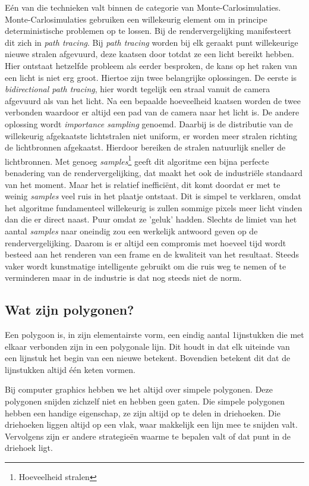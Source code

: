 \documentclass[12pt, a4paper]{article}
\begin{document}
Eén van die technieken valt binnen de categorie van Monte-Carlosimulaties. Monte-Carlosimulaties gebruiken een willekeurig element  om in principe deterministische problemen op te lossen. Bij de rendervergelijking manifesteert dit zich in \emph{path tracing}. Bij \emph{path tracing} worden bij elk geraakt punt willekeurige nieuwe stralen afgevuurd, deze kaatsen door totdat ze een licht bereikt hebben. Hier ontstaat hetzelfde probleem als eerder besproken, de kans op het raken van een licht is niet erg groot. Hiertoe zijn twee belangrijke oplossingen. De eerste is \emph{bidirectional path tracing}, hier wordt tegelijk een straal vanuit de camera afgevuurd als van het licht. Na een bepaalde hoeveelheid kaatsen worden de twee verbonden waardoor er altijd een pad van de camera naar het licht is. De andere oplossing wordt \emph{importance sampling} genoemd. Daarbij is de distributie van de willekeurig afgekaatste lichtstralen niet uniform, er worden meer stralen richting de lichtbronnen afgekaatst. Hierdoor bereiken de stralen natuurlijk sneller de lichtbronnen. Met genoeg \emph{samples}\footnote{Hoeveelheid stralen} geeft dit algoritme een bijna perfecte benadering van de rendervergelijking, dat maakt het ook de industriële standaard van het moment. Maar het is relatief inefficiënt, dit komt doordat er met te weinig \emph{samples} veel ruis in het plaatje ontstaat. Dit is simpel te verklaren, omdat het algoritme fundamenteel willekeurig is zullen sommige pixels meer licht vinden dan die er direct naast. Puur omdat ze 'geluk' hadden. Slechts de limiet van het aantal \emph{samples} naar oneindig zou een werkelijk antwoord geven op de rendervergelijking. Daarom is er altijd een compromis met hoeveel tijd wordt besteed aan het renderen van een frame en de kwaliteit van het resultaat. Steeds vaker wordt kunstmatige intelligente gebruikt om die ruis weg te nemen of te verminderen \cite{MonteCarloDenoiser} maar in de industrie is dat nog steeds niet de norm. 

\subsection{Wat zijn polygonen?}
Een polygoon is, in zijn elementairste vorm, een eindig aantal 1ijnstukken die met elkaar verbonden zijn in een polygonale lijn. Dit houdt in dat elk uiteinde van een lijnstuk het begin van een nieuwe betekent. Bovendien betekent dit dat de lijnstukken altijd één keten vormen. 

Bij computer graphics hebben we het altijd over simpele polygonen. Deze polygonen snijden zichzelf niet en hebben geen gaten. Die simpele polygonen hebben een handige eigenschap, ze zijn altijd op te delen in driehoeken. Die driehoeken liggen altijd op een vlak, waar makkelijk een lijn mee te snijden valt. Vervolgens zijn er andere strategieën waarme te bepalen valt of dat punt in de driehoek ligt. 
\end{document}
